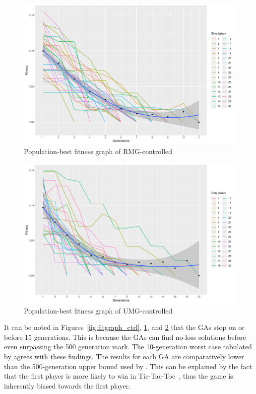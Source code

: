 \documentclass{strrespaper-journ}
\newcommand{\ttt}{Tic-Tac-Toe}
\begin{document}
		\begin{figure}[htbp]
			\centering
			\includegraphics[width=\linewidth]{../figures/rmg_ftrack}
			\caption{Population-best fitness graph of RMG-controlled}
			\label{fig:fitgraph_rmg}
		\end{figure}
		\begin{figure}[htbp]
			\centering
			\includegraphics[width=\linewidth]{../figures/umg_ftrack}
			\caption{Population-best fitness graph of UMG-controlled}
			\label{fig:fitgraph_umg}
		\end{figure}

		It can be noted in Figures~\ref{fig:fitgraph_ctrl}, \ref{fig:fitgraph_rmg}, and \ref{fig:fitgraph_umg} that the GAs stop on or before 15 generations.
		This is because the GAs can find no-loss solutions before even surpassing the 500 generation mark.
		The 10-generation worst case tabulated by \textcite{bhattSearchNolossStrategies2008} agrees with these findings.
		The results for each GA are comparatively lower than the 500-generation upper bound used by \textcite{bhattSearchNolossStrategies2008}.
		This can be explained by the fact that the first player is more likely to win in \ttt\ \autocite{cranenburghTicTacToe2007}, thus the game is inherently biased towards the first player.
\end{document}
